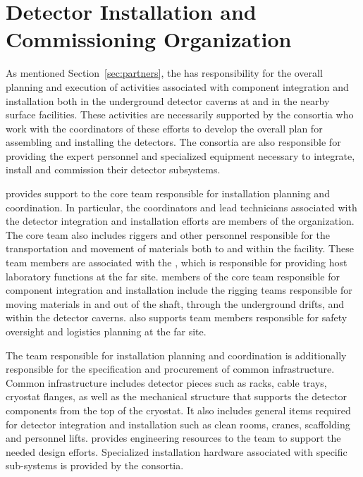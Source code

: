 \chapter{Detector Installation and Commissioning Organization}
\label{ch:tc-jpo}

As mentioned Section~\ref{sec:partners}, the  has
responsibility for the overall planning and execution of activities
associated with component integration and installation both in the
underground detector caverns at  and in the nearby surface
facilities.  These activities are necessarily supported by the
 consortia who work with the  coordinators of
these efforts to develop the overall plan for assembling and
installing the detectors.  The consortia are also responsible for
providing the expert personnel and specialized equipment necessary to
integrate, install and commission their detector subsystems.

  provides support to the core  team
responsible for installation planning and coordination.  
In
particular, the coordinators and lead technicians associated with the
detector integration and installation efforts are members of the
 organization.  The core team also includes riggers and
other personnel responsible for the transportation and movement of
materials both to and within the  facility.  These team members
are associated with the , which is responsible for providing
host laboratory functions at the far site.  members of the
 core team responsible for component integration and
installation include the rigging teams responsible for moving
materials in and out of the shaft, through the underground drifts,
and within the detector caverns.  also supports team
members responsible for safety oversight and logistics planning at the
far site.

The  team responsible for installation planning and
coordination is additionally responsible for the specification and
procurement of common infrastructure.  Common infrastructure includes
detector pieces such as racks, cable trays, cryostat flanges, as well
as the mechanical structure that supports the detector components from
the top of the cryostat.  It also includes general items required for
detector integration and installation such as clean rooms, cranes,
scaffolding and personnel lifts.    provides
engineering resources to the  team to support the needed
design efforts. Specialized installation hardware associated with
specific sub-systems is provided by the consortia.


